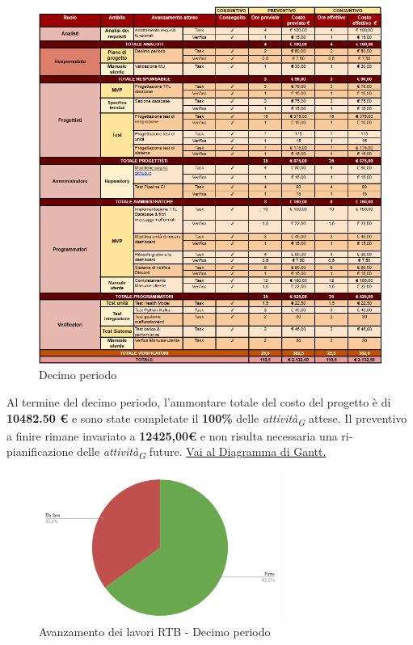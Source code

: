 \begin{figure}[H]
    \centering
    \includegraphics[height=1.1\textwidth]{../Images/periodo10.PNG}
    \caption{Decimo periodo}
    \label{fig:Decimo_periodo}
\end{figure}

Al termine del decimo periodo, l'ammontare totale del costo del progetto è di \textbf{10482.50 \euro} e sono state completate il \textbf{100\%} delle \textit{attività}\textsubscript{\textit{G}} attese.
Il preventivo a finire rimane invariato a \textbf{12425,00\euro} e non risulta necessaria una ri-pianificazione delle \textit{attività}\textsubscript{\textit{G}} future.
\href{https://github.com/orgs/ByteOps-swe/projects/3/views/1?sortedBy%5Bdirection%5D=asc&sortedBy%5BcolumnId%5D=64182560}{Vai al Diagramma di Gantt.}

\begin{figure}[H]
    \centering
    \begin{minipage}[b]{0.70\textwidth}
        \centering
        \includegraphics[width=0.7\textwidth]{../Images/avanzamento10Periodo.png}
        \caption{Avanzamento dei lavori RTB - Decimo periodo}
        \label{fig:Avanzamento_RTB_10}
    \end{minipage}
\end{figure}

